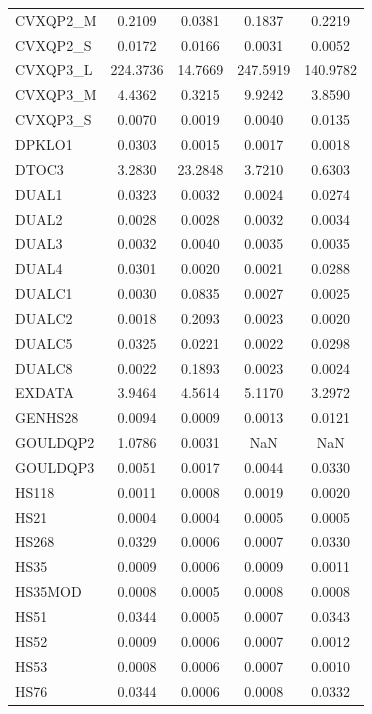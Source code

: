 \begin{longtable}{lcccc}
CVXQP2\_M &   0.2109 &   0.0381 &   0.1837 &   0.2219 \\
CVXQP2\_S &   0.0172 &   0.0166 &   0.0031 &   0.0052 \\
CVXQP3\_L & 224.3736 &  14.7669 & 247.5919 & 140.9782 \\
CVXQP3\_M &   4.4362 &   0.3215 &   9.9242 &   3.8590 \\
CVXQP3\_S &   0.0070 &   0.0019 &   0.0040 &   0.0135 \\
DPKLO1   &   0.0303 &   0.0015 &   0.0017 &   0.0018 \\
DTOC3    &   3.2830 &  23.2848 &   3.7210 &   0.6303 \\
DUAL1    &   0.0323 &   0.0032 &   0.0024 &   0.0274 \\
DUAL2    &   0.0028 &   0.0028 &   0.0032 &   0.0034 \\
DUAL3    &   0.0032 &   0.0040 &   0.0035 &   0.0035 \\
DUAL4    &   0.0301 &   0.0020 &   0.0021 &   0.0288 \\
DUALC1   &   0.0030 &   0.0835 &   0.0027 &   0.0025 \\
DUALC2   &   0.0018 &   0.2093 &   0.0023 &   0.0020 \\
DUALC5   &   0.0325 &   0.0221 &   0.0022 &   0.0298 \\
DUALC8   &   0.0022 &   0.1893 &   0.0023 &   0.0024 \\
EXDATA   &   3.9464 &   4.5614 &   5.1170 &   3.2972 \\
GENHS28  &   0.0094 &   0.0009 &   0.0013 &   0.0121 \\
GOULDQP2 &   1.0786 &   0.0031 &      NaN &      NaN \\
GOULDQP3 &   0.0051 &   0.0017 &   0.0044 &   0.0330 \\
HS118    &   0.0011 &   0.0008 &   0.0019 &   0.0020 \\
HS21     &   0.0004 &   0.0004 &   0.0005 &   0.0005 \\
HS268    &   0.0329 &   0.0006 &   0.0007 &   0.0330 \\
HS35     &   0.0009 &   0.0006 &   0.0009 &   0.0011 \\
HS35MOD  &   0.0008 &   0.0005 &   0.0008 &   0.0008 \\
HS51     &   0.0344 &   0.0005 &   0.0007 &   0.0343 \\
HS52     &   0.0009 &   0.0006 &   0.0007 &   0.0012 \\
HS53     &   0.0008 &   0.0006 &   0.0007 &   0.0010 \\
HS76     &   0.0344 &   0.0006 &   0.0008 &   0.0332 \\

\end{longtable}
